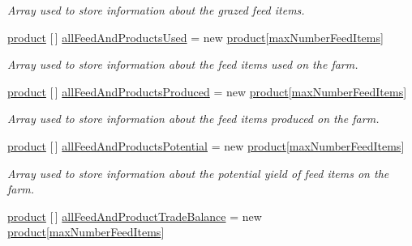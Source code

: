 \begin{DoxyCompactItemize}
\begin{DoxyCompactList}\small\item\em Array used to store information about the grazed feed items. \end{DoxyCompactList}\item 
\mbox{\hyperlink{class_global_vars_1_1product}{product}} \mbox{[}$\,$\mbox{]} \mbox{\hyperlink{class_global_vars_aa390108dd9539b57fdfa53809a6834f1}{all\+Feed\+And\+Products\+Used}} = new \mbox{\hyperlink{class_global_vars_1_1product}{product}}\mbox{[}\mbox{\hyperlink{class_global_vars_a42fa58d4be2a863e36b4ec8e8bee69cd}{max\+Number\+Feed\+Items}}\mbox{]}
\begin{DoxyCompactList}\small\item\em Array used to store information about the feed items used on the farm. \end{DoxyCompactList}\item 
\mbox{\hyperlink{class_global_vars_1_1product}{product}} \mbox{[}$\,$\mbox{]} \mbox{\hyperlink{class_global_vars_a9e40d65b9f8ceb4cca1620a3acb63efb}{all\+Feed\+And\+Products\+Produced}} = new \mbox{\hyperlink{class_global_vars_1_1product}{product}}\mbox{[}\mbox{\hyperlink{class_global_vars_a42fa58d4be2a863e36b4ec8e8bee69cd}{max\+Number\+Feed\+Items}}\mbox{]}
\begin{DoxyCompactList}\small\item\em Array used to store information about the feed items produced on the farm. \end{DoxyCompactList}\item 
\mbox{\hyperlink{class_global_vars_1_1product}{product}} \mbox{[}$\,$\mbox{]} \mbox{\hyperlink{class_global_vars_a382e4d64f254414a5db46b6ddc77ee8d}{all\+Feed\+And\+Products\+Potential}} = new \mbox{\hyperlink{class_global_vars_1_1product}{product}}\mbox{[}\mbox{\hyperlink{class_global_vars_a42fa58d4be2a863e36b4ec8e8bee69cd}{max\+Number\+Feed\+Items}}\mbox{]}
\begin{DoxyCompactList}\small\item\em Array used to store information about the potential yield of feed items on the farm. \end{DoxyCompactList}\item 
\mbox{\hyperlink{class_global_vars_1_1product}{product}} \mbox{[}$\,$\mbox{]} \mbox{\hyperlink{class_global_vars_a19c42ff016a916b57aaece2194efae34}{all\+Feed\+And\+Product\+Trade\+Balance}} = new \mbox{\hyperlink{class_global_vars_1_1product}{product}}\mbox{[}\mbox{\hyperlink{class_global_vars_a42fa58d4be2a863e36b4ec8e8bee69cd}{max\+Number\+Feed\+Items}}\mbox{]}

\end{DoxyCompactItemize}

